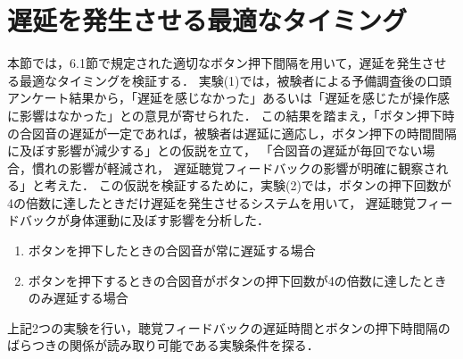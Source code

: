 \section{遅延を発生させる最適なタイミング}
本節では，6.1節で規定された適切なボタン押下間隔を用いて，遅延を発生させる最適なタイミングを検証する．
実験(1)では，被験者による予備調査後の口頭アンケート結果から，「遅延を感じなかった」あるいは「遅延を感じたが操作感に影響はなかった」との意見が寄せられた．
この結果を踏まえ，「ボタン押下時の合図音の遅延が一定であれば，被験者は遅延に適応し，ボタン押下の時間間隔に及ぼす影響が減少する」との仮説を立て，
「合図音の遅延が毎回でない場合，慣れの影響が軽減され，
遅延聴覚フィードバックの影響が明確に観察される」と考えた．
この仮説を検証するために，実験(2)では，ボタンの押下回数が4の倍数に達したときだけ遅延を発生させるシステムを用いて，
遅延聴覚フィードバックが身体運動に及ぼす影響を分析した．
\begin{enumerate}[leftmargin=*, label=実験(\arabic*)]
    \item ボタンを押下したときの合図音が常に遅延する場合
    \item ボタンを押下するときの合図音がボタンの押下回数が4の倍数に達したときのみ遅延する場合
\end{enumerate}
上記2つの実験を行い，聴覚フィードバックの遅延時間とボタンの押下時間隔のばらつきの関係が読み取り可能である実験条件を探る．
